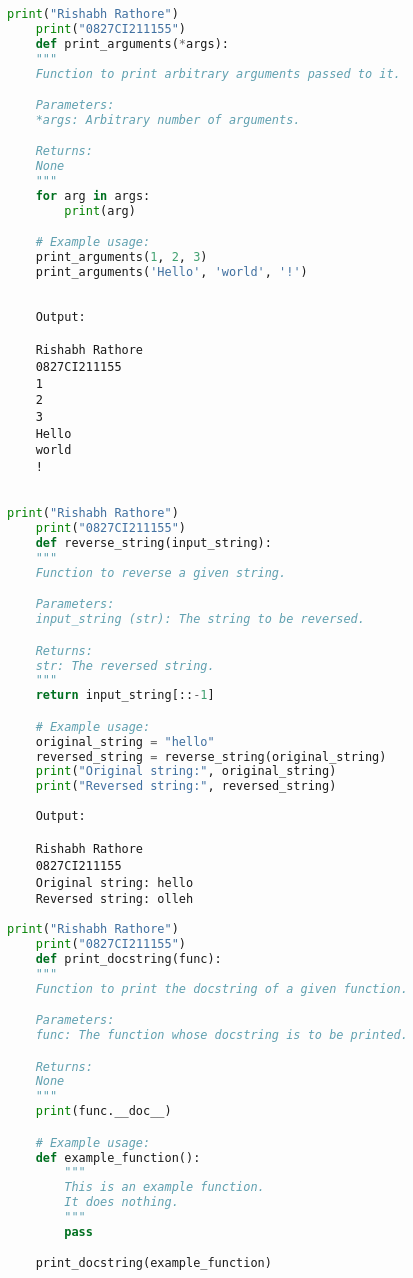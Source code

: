 \documentclass{report}
\begin{document}
\bigskip


\sol 
\begin{lstlisting}[language=Python]
	print("Rishabh Rathore")
	print("0827CI211155")
	def print_arguments(*args):
    """
    Function to print arbitrary arguments passed to it.

    Parameters:
    *args: Arbitrary number of arguments.

    Returns:
    None
    """
    for arg in args:
        print(arg)

	# Example usage:
	print_arguments(1, 2, 3)
	print_arguments('Hello', 'world', '!')
  

\end{lstlisting}

\begin{verbatim}
	Output:

	Rishabh Rathore
	0827CI211155
	1
	2
	3
	Hello
	world
	!
		

\end{verbatim}


\bigskip


\sol 
\begin{lstlisting}[language=Python]
	print("Rishabh Rathore")
	print("0827CI211155")
	def reverse_string(input_string):
    """
    Function to reverse a given string.

    Parameters:
    input_string (str): The string to be reversed.

    Returns:
    str: The reversed string.
    """
    return input_string[::-1]

	# Example usage:
	original_string = "hello"
	reversed_string = reverse_string(original_string)
	print("Original string:", original_string)
	print("Reversed string:", reversed_string)

\end{lstlisting}

\begin{verbatim}
	Output:

	Rishabh Rathore
	0827CI211155
	Original string: hello
	Reversed string: olleh

\end{verbatim}


\bigskip


\sol 
\begin{lstlisting}[language=Python]
	print("Rishabh Rathore")
	print("0827CI211155")
	def print_docstring(func):
    """
    Function to print the docstring of a given function.

    Parameters:
    func: The function whose docstring is to be printed.

    Returns:
    None
    """
    print(func.__doc__)

	# Example usage:
	def example_function():
		"""
		This is an example function.
		It does nothing.
		"""
		pass

	print_docstring(example_function)

\end{lstlisting}
\end{document}
